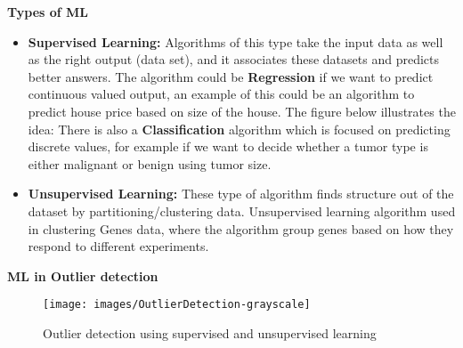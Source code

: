 \textbf{Types of ML}
\begin{itemize}
\item \textbf{Supervised Learning:}
Algorithms of this type take the input data as well as the right output (data set), and it associates these datasets and predicts better answers. The algorithm could be \textbf{Regression} if we want to predict continuous valued output, an example of this could be an algorithm to predict house price based on size of the house. The figure below illustrates the idea:
There is also a \textbf{Classification} algorithm which is focused on predicting discrete values, for example if we want to decide whether a tumor type is either malignant or benign using tumor size.
\item \textbf{Unsupervised Learning:}
These type of algorithm finds structure out of the dataset by partitioning/clustering data. Unsupervised learning algorithm used in clustering Genes data, where the algorithm group genes based on how they respond to different experiments.
\end{itemize}

\textbf{ML in Outlier detection}
\begin{figure}[!h]
\centering 
\texttt{[image: images/OutlierDetection-grayscale]}
\caption{Outlier detection using supervised and unsupervised learning}
\label{ML-OutlierDetection}
\end{figure}